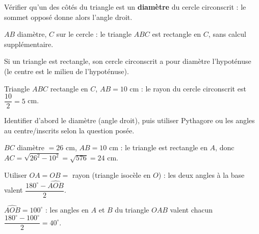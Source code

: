 Vérifier qu'un des côtés du triangle est un \textbf{diamètre} du cercle circonscrit : le
sommet opposé donne alors l'angle droit.
\begin{exemple}
$AB$ diamètre, $C$ sur le cercle : le triangle $ABC$ est rectangle en $C$, sans calcul
supplémentaire.
\end{exemple}

Si un triangle est rectangle, son cercle circonscrit a pour diamètre l'hypoténuse (le
centre est le milieu de l'hypoténuse).
\begin{exemple}
Triangle $ABC$ rectangle en $C$, $AB=10$ cm : le rayon du cercle circonscrit est
$\dfrac{10}2=5$ cm.
\end{exemple}

Identifier d'abord le diamètre (angle droit), puis utiliser Pythagore ou les angles au
centre/inscrits selon la question posée.
\begin{exemple}
$BC$ diamètre $=26$ cm, $AB=10$ cm : le triangle est rectangle en $A$, donc
$AC=\sqrt{26^{2}-10^{2}}=\sqrt{576}=24$ cm.
\end{exemple}

Utiliser $OA=OB=$ rayon (triangle isocèle en $O$) : les deux angles à la base valent
$\dfrac{180^{\circ}-\widehat{AOB}}2$.
\begin{exemple}
$\widehat{AOB}=100^{\circ}$ : les angles en $A$ et $B$ du triangle $OAB$ valent chacun
$\dfrac{180^{\circ}-100^{\circ}}2=40^{\circ}$.
\end{exemple}


